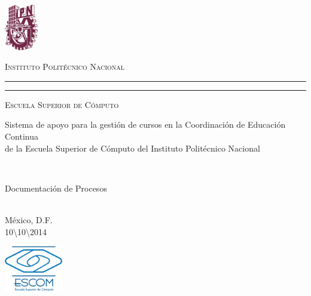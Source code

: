 \newcommand{\grupo}[1]{\def\elgrupo{#1}}
\newcommand{\fecha}[1]{\def\lafecha{#1}}
\newcommand{\materia}[1]{\def\lamateria{#1}}
\newcommand{\lugar}[1]{\def\ellugar{#1}}

\grupo{}
\fecha{10\textbackslash10\textbackslash2014}
\materia{Ingeniería de Software}
\lugar{México, D.F.}

\thispagestyle{empty}

\hskip-1.5cm
\begin{minipage}[c][10cm][s]{4cm} 
  \begin{center}
    \includegraphics[height=2cm]{images/ipn}\\[10pt]
  \end{center}
\end{minipage}\quad
\begin{minipage}[c][9.5cm][s]{10cm}
  \begin{center}
    {\large \scshape Instituto Polit\'ecnico Nacional}
    \vspace{.3cm}
    \hrule height2pt
    \vspace{.1cm}
    \hrule height1pt
    \vspace{.3cm}
    {\scshape Escuela Superior de C\'omputo}
    \vspace{3cm}
    \vspace{2cm}
    \parbox{9cm}{\huge \centering Sistema de apoyo para la gestión de cursos en la Coordinación de Educación Continua\\ de la Escuela Superior de Cómputo del Instituto Politécnico Nacional\\}\\[8pt]
    \vspace{2cm}
    \parbox{9cm}{\huge \centering Documentación de Procesos}\\[6pt]
    \vspace{2cm}
    \vspace{2cm}
    \ellugar\\[8pt]
    \lafecha\\[8pt]
  \end{center}
\end{minipage}
\begin{minipage}[c][10cm][s]{5cm} 
  \begin{center}
    \includegraphics[height=2cm]{images/logo}\\[10pt]
  \end{center}
\end{minipage}\quad


